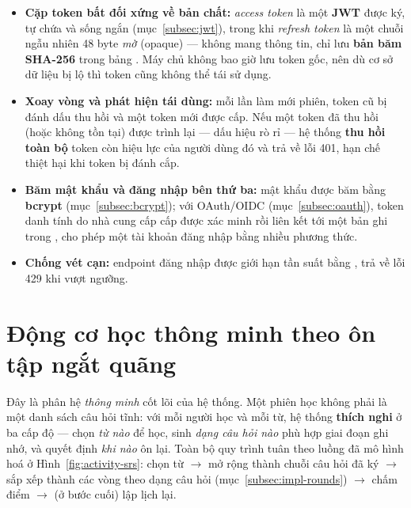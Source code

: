 \begin{itemize}
  \item \textbf{Cặp token bất đối xứng về bản chất:} \textit{access token} là
        một \textbf{JWT} được ký, tự chứa và sống ngắn (mục~\ref{subsec:jwt}),
        trong khi \textit{refresh token} là một chuỗi ngẫu nhiên 48 byte
        \textit{mờ} (opaque) --- không mang thông tin, chỉ lưu \textbf{bản băm
        SHA-256} trong bảng . Máy chủ không bao giờ lưu
        token gốc, nên dù cơ sở dữ liệu bị lộ thì token cũng không thể tái sử
        dụng.
  \item \textbf{Xoay vòng và phát hiện tái dùng:} mỗi lần làm mới phiên, token
        cũ bị đánh dấu thu hồi và một token mới được cấp. Nếu một token đã thu
        hồi (hoặc không tồn tại) được trình lại --- dấu hiệu rò rỉ --- hệ thống
        \textbf{thu hồi toàn bộ} token còn hiệu lực của người dùng đó và trả
        về lỗi 401, hạn chế thiệt hại khi token bị đánh cắp.
  \item \textbf{Băm mật khẩu và đăng nhập bên thứ ba:} mật khẩu được băm bằng
        \textbf{bcrypt} (mục~\ref{subsec:bcrypt}); với OAuth/OIDC
        (mục~\ref{subsec:oauth}), token danh tính do nhà cung cấp cấp được xác
        minh rồi liên kết tới một bản ghi trong , cho
        phép một tài khoản đăng nhập bằng nhiều phương thức.
  \item \textbf{Chống vét cạn:} endpoint đăng nhập được giới hạn tần suất bằng
        , trả về lỗi 429 khi vượt ngưỡng.
\end{itemize}

\section{Động cơ học thông minh theo ôn tập ngắt quãng}
\label{sec:dong-co-hoc}

Đây là phân hệ \textit{thông minh} cốt lõi của hệ thống. Một phiên học không
phải là một danh sách câu hỏi tĩnh: với mỗi người học và mỗi từ, hệ thống
\textbf{thích nghi} ở ba cấp độ --- chọn \textit{từ nào} để học, sinh
\textit{dạng câu hỏi nào} phù hợp giai đoạn ghi nhớ, và quyết định
\textit{khi nào} ôn lại. Toàn bộ quy trình tuân theo luồng đã mô hình hoá ở
Hình~\ref{fig:activity-srs}: chọn từ $\rightarrow$ mở rộng thành chuỗi câu hỏi
đã ký $\rightarrow$ sắp xếp thành các vòng theo dạng câu hỏi
(mục~\ref{subsec:impl-rounds}) $\rightarrow$ chấm điểm $\rightarrow$ (ở bước
cuối) lập lịch lại.

